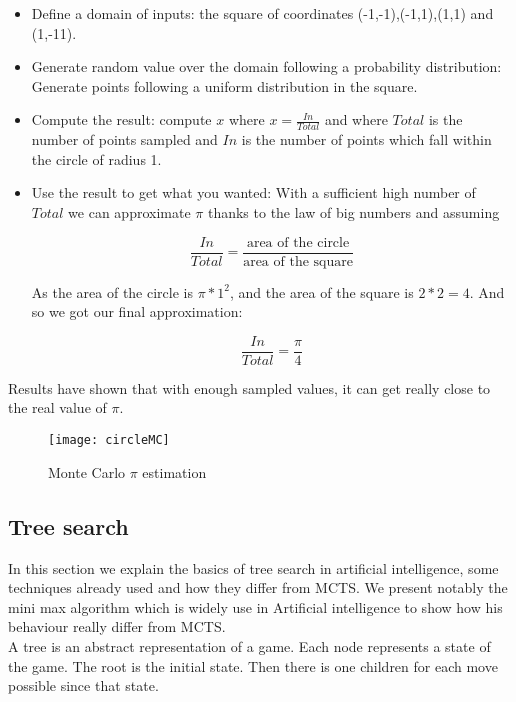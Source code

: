 \begin{itemize}
\item Define a domain of inputs: the square of coordinates (-1,-1),(-1,1),(1,1) and (1,-11).
\item Generate random value over the domain following a probability distribution: Generate points following a uniform distribution in the square. 
\item Compute the result: compute $x$ where $x = \frac{In}{Total}$ and where $Total$ is the number of points sampled and $In$ is the number of points which fall within the circle of radius 1. 
\item Use the result to get what you wanted: With a sufficient high number of $Total$ we can approximate $\pi$ thanks to the law of big numbers and assuming


$$\frac{In}{Total}= \frac{\textrm{area of the circle}}{\textrm{area of the square}}$$

 As the area of the circle is $ \pi*1^2$, and the area of the square is $2*2=4$. And so we got our final approximation: 

$$
\frac{In}{Total}=\frac{\pi}{4}
$$
\end{itemize} 

Results have shown that with enough sampled values, it can get really close to the real value of $\pi$. 
\begin{figure}
\begin{center}
\texttt{[image: circleMC]}
\end{center}
\caption{Monte Carlo $\pi$ estimation}
\end{figure}
\subsection{Tree search}
In this section we explain the basics of tree search in artificial intelligence, some techniques already used and how they differ from MCTS. We present notably the mini max algorithm which is widely use in Artificial intelligence to show how his behaviour really differ from MCTS. 
\\

A tree is an abstract representation of a game. Each node represents a state of the game. The root is the initial state. Then there is one children for each move possible since that state. 
\\

